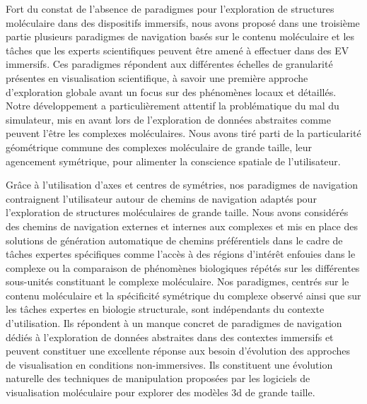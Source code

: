 
Fort du constat de l'absence de paradigmes pour l'exploration de structures moléculaire dans des dispositifs immersifs, nous avons proposé dans une troisième partie plusieurs paradigmes de navigation basés sur le contenu moléculaire et les tâches que les experts scientifiques peuvent être amené à effectuer dans des EV immersifs. Ces paradigmes répondent aux différentes échelles de granularité présentes en visualisation scientifique, à savoir une première approche d'exploration globale avant un focus sur des phénomènes locaux et détaillés. Notre développement a particulièrement attentif la problématique du mal du simulateur, mis en avant lors de l'exploration de données abstraites comme peuvent l'être les complexes moléculaires. Nous avons tiré parti de la particularité géométrique commune des complexes moléculaire de grande taille, leur agencement symétrique, pour alimenter la conscience spatiale de l'utilisateur.

Grâce à l'utilisation d'axes et centres de symétries, nos paradigmes de navigation contraignent l'utilisateur autour de chemins de navigation adaptés pour l'exploration de structures moléculaires de grande taille. Nous avons considérés des chemins de navigation externes et internes aux complexes et mis en place des solutions de génération automatique de chemins préférentiels dans le cadre de tâches expertes spécifiques comme l'accès à des régions d'intérêt enfouies dans le complexe ou la comparaison de phénomènes biologiques répétés sur les différentes sous-unités constituant le complexe moléculaire.
Nos paradigmes, centrés sur le contenu moléculaire et la spécificité symétrique du complexe observé ainsi que sur les tâches expertes en biologie structurale, sont indépendants du contexte d'utilisation. Ils répondent à un manque concret de paradigmes de navigation dédiés à l'exploration de données abstraites dans des contextes immersifs et peuvent constituer une excellente réponse aux besoin d'évolution des approches de visualisation en conditions non-immersives. Ils constituent une évolution naturelle des techniques de manipulation proposées par les logiciels de visualisation moléculaire pour explorer des modèles 3d de grande taille.



